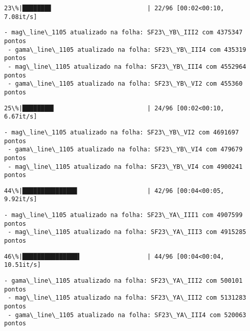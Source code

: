 \documentclass[11pt]{article}
\begin{document}
    \begin{Verbatim}[commandchars=\\\{\}]
 23\%|███████▊                          | 22/96 [00:02<00:10,  7.08it/s]
    \end{Verbatim}

    \begin{Verbatim}[commandchars=\\\{\}]
 - mag\_line\_1105 atualizado na folha: SF23\_YB\_III2 com 4375347 pontos
 - gama\_line\_1105 atualizado na folha: SF23\_YB\_III4 com 435319 pontos
 - mag\_line\_1105 atualizado na folha: SF23\_YB\_III4 com 4552964 pontos
 - gama\_line\_1105 atualizado na folha: SF23\_YB\_VI2 com 455360 pontos
    \end{Verbatim}

    \begin{Verbatim}[commandchars=\\\{\}]
 25\%|████████▌                         | 24/96 [00:02<00:10,  6.67it/s]
    \end{Verbatim}

    \begin{Verbatim}[commandchars=\\\{\}]
 - mag\_line\_1105 atualizado na folha: SF23\_YB\_VI2 com 4691697 pontos
 - gama\_line\_1105 atualizado na folha: SF23\_YB\_VI4 com 479679 pontos
 - mag\_line\_1105 atualizado na folha: SF23\_YB\_VI4 com 4900241 pontos
    \end{Verbatim}

    \begin{Verbatim}[commandchars=\\\{\}]
 44\%|██████████████▉                   | 42/96 [00:04<00:05,  9.92it/s]
    \end{Verbatim}

    \begin{Verbatim}[commandchars=\\\{\}]
 - mag\_line\_1105 atualizado na folha: SF23\_YA\_III1 com 4907599 pontos
 - mag\_line\_1105 atualizado na folha: SF23\_YA\_III3 com 4915285 pontos
    \end{Verbatim}

    \begin{Verbatim}[commandchars=\\\{\}]
 46\%|███████████████▌                  | 44/96 [00:04<00:04, 10.51it/s]
    \end{Verbatim}

    \begin{Verbatim}[commandchars=\\\{\}]
 - gama\_line\_1105 atualizado na folha: SF23\_YA\_III2 com 500101 pontos
 - mag\_line\_1105 atualizado na folha: SF23\_YA\_III2 com 5131283 pontos
 - gama\_line\_1105 atualizado na folha: SF23\_YA\_III4 com 520063 pontos
    \end{Verbatim}
\end{document}
